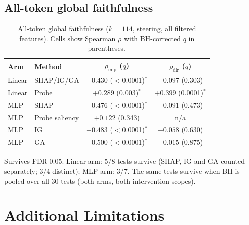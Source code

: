\subsection{All-token global faithfulness}
\label{app:all-token-global-faithfulness}
\begin{table}[h!]
    \centering
    \small
    \setlength{\tabcolsep}{5pt}
    \caption{All-token global faithfulness ($k=114$, steering, all filtered features). Cells show Spearman $\rho$ with BH-corrected $q$ in parentheses.}
    \label{tab:all-selection-faithfulness}
    \begin{threeparttable}
    \begin{tabular}{llcc}
        \toprule
        Arm & Method & $\rho_\text{imp}$ ($q$) & $\rho_\text{dir}$ ($q$) \\
        \midrule
        Linear & SHAP/IG/GA     & $+0.430$ ($<$0.0001)$^*$ & $-0.097$ (0.303) \\
        Linear & Probe          & $+0.289$ (0.003)$^*$  & $+0.399$ (0.0001)$^*$ \\
        \midrule
        MLP    & SHAP           & $+0.476$ ($<$0.0001)$^*$ & $-0.091$ (0.473) \\
        MLP    & Probe saliency & $+0.122$ (0.343)      & n/a \\
        MLP    & IG             & $+0.483$ ($<$0.0001)$^*$ & $-0.058$ (0.630) \\
        MLP    & GA             & $+0.500$ ($<$0.0001)$^*$ & $-0.015$ (0.875) \\
        \bottomrule
    \end{tabular}
    \begin{tablenotes}\footnotesize
        \item[$^*$] Survives FDR 0.05. Linear arm: 5/8 tests survive (SHAP, IG and GA counted separately; 3/4 distinct); MLP arm: 3/7. The same tests survive when BH is pooled over all 30 tests (both arms, both intervention scopes).
    \end{tablenotes}
    \end{threeparttable}
\end{table}

\clearpage
\section{Additional Limitations}
\label{app:limitations}

